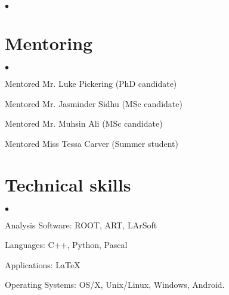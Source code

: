 \documentclass[margin,line]{res}
\newenvironment{list2}{
  \begin{list}{$\bullet$}{%
      \setlength{\itemsep}{0in}
      \setlength{\parsep}{0in} \setlength{\parskip}{0in}
      \setlength{\topsep}{0in} \setlength{\partopsep}{0in} 
      \setlength{\leftmargin}{0.2in}}}{\end{list}}
\begin{document}
\begin{resume}
\begin{list2}
\end{list2}

\section{\sc Mentoring }
\begin{list2}
\item Mentored Mr. Luke Pickering (PhD candidate)
\item Mentored Mr. Jasminder Sidhu (MSc candidate)
\item Mentored Mr. Muhsin Ali (MSc candidate)
\item Mentored Miss Tessa Carver (Summer student)


\end{list2}


\section{\sc Technical skills} 
\begin{list2}
\item Analysis Software: ROOT, ART, LArSoft
\item Languages: C++, Python, Pascal
\item Applications:  \LaTeX
\item Operating Systems:  OS/X, Unix/Linux, Windows, Android.


\end{list2}


\newpage


\end{resume}
\end{document}
